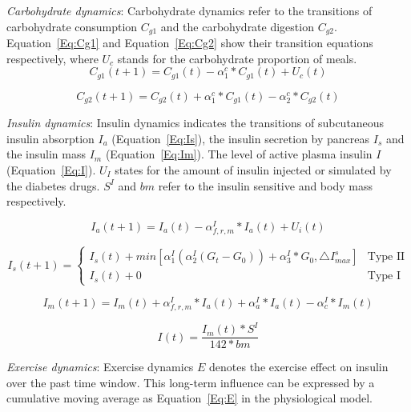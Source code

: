 \emph{Carbohydrate dynamics}: 
Carbohydrate dynamics refer to the transitions of carbohydrate consumption $C_{g1}$ and the carbohydrate digestion $C_{g2}$.
Equation~\ref{Eq:Cg1} and Equation~\ref{Eq:Cg2} show their transition equations respectively, where $U_{c}$ stands for the carbohydrate proportion of meals.
\begin{equation}\label{Eq:Cg1}
C_{g1}(t+1)=C_{g1}(t)-\alpha_{1}^c*C_{g1}(t)+U_{c}(t)
\end{equation}

\begin{equation}\label{Eq:Cg2}
C_{g2}(t+1)=C_{g2}(t)+\alpha_{1}^c*C_{g1}(t)-\alpha_{2}^c*C_{g2}(t)
\end{equation}

\emph{Insulin dynamics}: Insulin dynamics indicates the transitions of subcutaneous insulin absorption $I_{a}$ (Equation~\ref{Eq:Is}),
the insulin secretion by pancreas $I_{s}$ and  the insulin mass $I_{m}$ (Equation~\ref{Eq:Im}). The level of active plasma insulin $I$ (Equation~\ref{Eq:I}). $U_{I}$
states for the amount of insulin injected or simulated by the diabetes drugs. $S^I$ and $bm$ refer to the insulin sensitive
and body mass respectively.

\begin{equation}\label{Eq:Is}
I_{a}(t+1)=I_{a}(t)-\alpha_{f,r,m}^I*I_{a}(t)+U_{i}(t)
\end{equation}


\begin{equation}\label{Eq:Isec}
    I_{s}(t+1)=
   \begin{cases}
    I_{s}(t)+min[\alpha_1^I(\alpha_2^I(G_t-G_0))+\alpha_3^I*G_0, \triangle I_{max}^{s}] &\mbox{Type II}\\
    I_{s}(t)+0 &\mbox{Type I}
   \end{cases}
  \end{equation}

\begin{equation}\label{Eq:Im}
I_{m}(t+1)=I_{m}(t)+\alpha_{f,r,m}^I*I_{a}(t)+\alpha_{a}^I*I_{a}(t)-\alpha_c^I*I_{m}(t)
\end{equation}


\begin{equation}\label{Eq:I}
I(t)=\frac{I_{m}(t)*S^I}{142*bm}
\end{equation}

\emph{Exercise dynamics}: Exercise dynamics $E$ denotes the exercise effect on insulin over the past time window. This
long-term influence can be expressed by a cumulative moving average \cite{bib:lowry1992multivariate, bib:cma} as Equation~\ref{Eq:E} in the physiological model.

